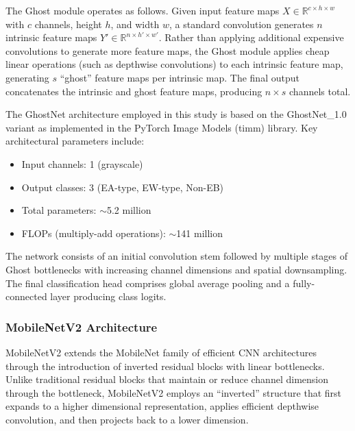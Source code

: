 \documentclass[11pt,a4paper]{article}
\newcommand{\EA}{EA-type}
\newcommand{\EW}{EW-type}
\begin{document}
The Ghost module operates as follows. Given input feature maps $X \in \mathbb{R}^{c \times h \times w}$ with $c$ channels, height $h$, and width $w$, a standard convolution generates $n$ intrinsic feature maps $Y' \in \mathbb{R}^{n \times h' \times w'}$. Rather than applying additional expensive convolutions to generate more feature maps, the Ghost module applies cheap linear operations (such as depthwise convolutions) to each intrinsic feature map, generating $s$ ``ghost'' feature maps per intrinsic map. The final output concatenates the intrinsic and ghost feature maps, producing $n \times s$ channels total.

The GhostNet architecture employed in this study is based on the GhostNet\_1.0 variant as implemented in the PyTorch Image Models (timm) library. Key architectural parameters include:
\begin{itemize}
    \item Input channels: 1 (grayscale)
    \item Output classes: 3 (\EA, \EW, Non-EB)
    \item Total parameters: $\sim$5.2 million
    \item FLOPs (multiply-add operations): $\sim$141 million
\end{itemize}

The network consists of an initial convolution stem followed by multiple stages of Ghost bottlenecks with increasing channel dimensions and spatial downsampling. The final classification head comprises global average pooling and a fully-connected layer producing class logits.

\subsubsection{MobileNetV2 Architecture}

MobileNetV2 \citep{sandler2018mobilenetv2} extends the MobileNet family of efficient CNN architectures through the introduction of inverted residual blocks with linear bottlenecks. Unlike traditional residual blocks that maintain or reduce channel dimension through the bottleneck, MobileNetV2 employs an ``inverted'' structure that first expands to a higher dimensional representation, applies efficient depthwise convolution, and then projects back to a lower dimension.
\end{document}
